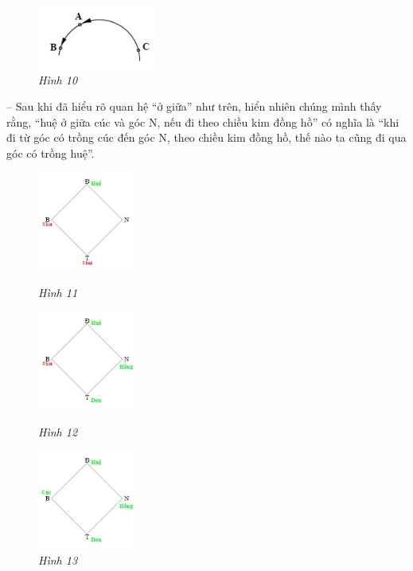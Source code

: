 	\vskip 0.1cm
	\begin{figure}
		\centering
		\vspace*{-10pt}
		\captionsetup{labelformat= empty, justification=centering}
		\includegraphics[width=0.35\textwidth]{pic10}
		\caption{\small\textit{Hình 10}}
		\vspace*{-10pt}
	\end{figure}
	-- Sau khi đã hiểu rõ quan hệ “ở giữa” như trên, hiển nhiên chúng mình thấy rằng, “huệ ở giữa cúc và góc N, nếu đi theo chiều kim đồng hồ” có nghĩa là “khi đi từ góc có trồng cúc đến góc N, theo chiều kim đồng hồ, thế nào ta cũng đi qua góc có trồng huệ”. 
	\vskip 0.1cm
	\begin{figure}
		\vspace*{-25pt}
		\centering
		\captionsetup{labelformat=empty, justification=centering}
		\hspace*{-7pt}\includegraphics[width= 0.29\textwidth]{pic11}
		
		\vspace*{-5pt}
		\caption{\textit{\small Hình 11}}
		\hspace*{-7pt}\includegraphics[width= 0.29\textwidth]{pic12}
		
		\vspace*{-10pt}
		\caption{\textit{\small Hình 12}}
		\vspace*{-25pt}
		
		\hspace*{-7pt}\includegraphics[width= 0.29\textwidth]{pic13}
		
		\vspace*{-15pt}
		\caption{\textit{\small Hình 13}}
		\vspace*{-25pt}
	\end{figure}
